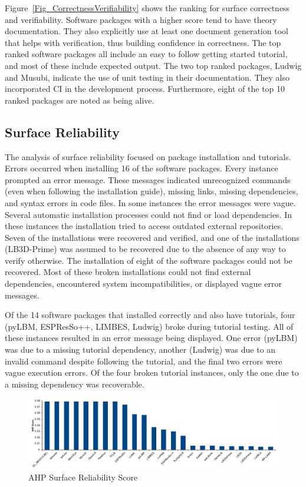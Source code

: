 \documentclass[final, 3p, times, authoryear]{elsarticle}
\begin{document}
Figure~\ref{Fig_CorrectnessVerifiability} shows the ranking for surface
correctness and verifiability. Software packages with a higher score tend to
have theory documentation. They also explicitly use at least one document
generation tool that helps with verification, thus building confidence in
correctness. The top ranked software packages all include an easy to follow
getting started tutorial, and most of these include expected output. The two top
ranked packages, Ludwig and Musubi, indicate the use of unit testing in their
documentation. They also incorporated CI in the development
process. Furthermore, eight of the top 10 ranked packages are noted as being
alive.

\subsection{Surface Reliability}

The analysis of surface reliability focused on package installation and
tutorials. Errors occurred when installing 16 of the software packages. Every
instance prompted an error message. These messages indicated unrecognized
commands (even when following the installation guide), missing links, missing
dependencies, and syntax errors in code files. In some instances the error
messages were vague. Several automatic installation processes could not find or
load dependencies. In these instances the installation tried to access outdated
external repositories. Seven of the installations were recovered and verified,
and one of the installations (LB3D-Prime) was assumed to be recovered due to the
absence of any way to verify otherwise. The installation of eight of the software
packages could not be recovered. Most of these broken installations could not
find external dependencies, encountered system incompatibilities, or displayed
vague error messages.

Of the 14 software packages that installed correctly and also have tutorials,
four (pyLBM, ESPResSo++, LIMBES, Ludwig) broke during tutorial testing. All of
these instances resulted in an error message being displayed. One error (pyLBM)
was due to a missing tutorial dependency, another (Ludwig) was due to an invalid
command despite following the tutorial, and the final two errors were vague
execution errors. Of the four broken tutorial instances, only the one due to a
missing dependency was recoverable. 

\begin{figure}[h!]
	\begin{center}
		\includegraphics[width=1.0\textwidth]{./figures/reliability_chart.pdf}
		\caption{AHP Surface Reliability Score}
		\label{Fig_Reliability}
	\end{center}
\end{figure}
\end{document}
